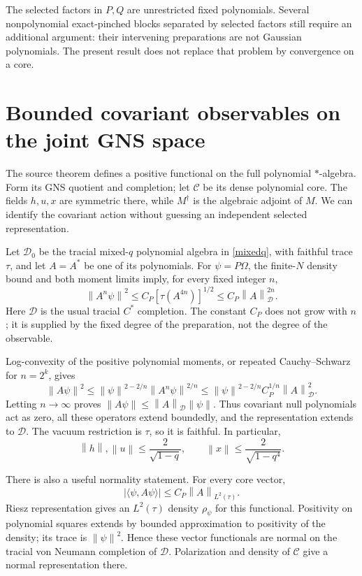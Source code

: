\documentclass[11pt]{article}
\newcommand{\norm}[1]{\left\lVert#1\right\rVert}
\begin{document}
The selected factors in $P,Q$ are unrestricted fixed polynomials.
Several nonpolynomial exact-pinched blocks separated by selected
factors still require an additional argument: their intervening
preparations are not Gaussian polynomials. The present result does
not replace that problem by convergence on a core.

\newpage
\section{Bounded covariant observables on the joint GNS space}
The source theorem defines a positive functional on the full
polynomial $*$-algebra. Form its GNS quotient and completion;
let $\mathcal C$ be its dense polynomial core. The fields
$h,u,x$ are symmetric there, while $M^\dagger$ is the algebraic
adjoint of $M$. We can identify the covariant action without
guessing an independent selected representation.

Let $\mathcal D_0$ be the tracial mixed-$q$ polynomial algebra in
\eqref{mixedq}, with faithful trace $\tau$, and let $A=A^*$ be one
of its polynomials. For $\psi=P\Omega$, the finite-$N$ density bound
and both moment limits imply, for every fixed integer $n$,
\begin{equation}\label{power}
 \norm{A^n\psi}^2
 \le C_P\left[\tau(A^{4n})\right]^{1/2}
 \le C_P\norm{A}_{\mathcal D}^{2n}.
\end{equation}
Here $\mathcal D$ is the usual tracial $C^*$ completion. The constant
$C_P$ does not grow with $n$; it is supplied by the fixed degree of
the preparation, not the degree of the observable.

Log-convexity of the positive polynomial moments, or repeated
Cauchy--Schwarz for $n=2^k$, gives
\begin{equation}
 \norm{A\psi}^2\le
 \norm{\psi}^{2-2/n}\norm{A^n\psi}^{2/n}
 \le\norm{\psi}^{2-2/n}C_P^{1/n}\norm{A}_{\mathcal D}^2.
\end{equation}
Letting $n\to\infty$ proves
$\norm{A\psi}\le\norm{A}_{\mathcal D}\norm{\psi}$.
Thus covariant null polynomials act as zero, all these operators extend
boundedly, and the representation extends to $\mathcal D$.
The vacuum restriction is $\tau$, so it is faithful. In particular,
\begin{equation}
 \norm{h},\norm{u}\le\frac2{\sqrt{1-q}},\qquad
 \norm{x}\le\frac2{\sqrt{1-q^4}}.
\end{equation}

There is also a useful normality statement. For every core vector,
\begin{equation}\label{normal}
 |\langle\psi,A\psi\rangle|\le C_P\norm{A}_{L^2(\tau)}.
\end{equation}
Riesz representation gives an $L^2(\tau)$ density $\rho_\psi$ for
this functional. Positivity on polynomial squares extends by bounded
approximation to positivity of the density; its trace is
$\norm{\psi}^2$. Hence these vector functionals are normal on the
tracial von Neumann completion of $\mathcal D$. Polarization and
density of $\mathcal C$ give a normal representation there.
\end{document}
